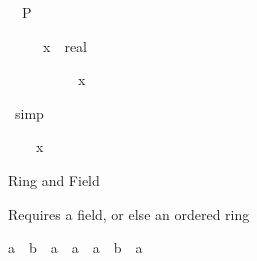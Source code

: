 \begin{isabellebody}
\begin{isamarkuptxt}
\begin{isabelle}
\ {}{\isachardot}\ P\ {\isacharparenleft}{}\ {\isacharslash}\ {}{\isacharparenright}%
\end{isabelle}%
\end{isamarkuptxt}%
\isamarkuptrue%
\isamarkupfalse%
%
\endisatagproof
{\isafoldproof}%
%
\isadelimproof
%
\endisadelimproof
\isanewline
\isanewline
{}\isamarkupfalse%
\ {\isachardoublequoteopen}{\isacharparenleft}{}{\isacharslash}{}{\isacharparenright}\ {\isacharasterisk}\ {\isacharparenleft}{}{\isacharslash}{}{}{\isacharparenright}\ {\isacharless}\ {\isacharparenleft}x\ {\isacharcolon}{\isacharcolon}\ real{\isacharparenright}{\isachardoublequoteclose}%
\isadelimproof
%
\endisadelimproof
%
\isatagproof
%
\begin{isamarkuptxt}%
\begin{isabelle}%
\ {}{\isachardot}\ {}\ {\isacharslash}\ {}\ {\isacharasterisk}\ {\isacharparenleft}{}\ {\isacharslash}\ {}{}{\isacharparenright}\ {\isacharless}\ x%
\end{isabelle}%
\end{isamarkuptxt}%
\isamarkuptrue%
\isamarkupfalse%
\ simp%
\begin{isamarkuptxt}%
\begin{isabelle}%
\ {}{\isachardot}\ {}\ {\isacharless}\ x\ {\isacharasterisk}\ {}%
\end{isabelle}%
\end{isamarkuptxt}%
\isamarkuptrue%
\isamarkupfalse%
%
\endisatagproof
{\isafoldproof}%
%
\isadelimproof
%
\endisadelimproof
%
\begin{isamarkuptext}%
Ring and Field

Requires a field, or else an ordered ring

\begin{isabelle}%
{\isacharparenleft}a\ {\isacharasterisk}\ b\ {\isacharequal}\ {\isacharparenleft}{}{\isasymColon}{\isacharprime}a{\isacharparenright}{\isacharparenright}\ {\isacharequal}\ {\isacharparenleft}a\ {\isacharequal}\ {\isacharparenleft}{}{\isasymColon}{\isacharprime}a{\isacharparenright}\ {\isasymor}\ b\ {\isacharequal}\ {\isacharparenleft}{}{\isasymColon}{\isacharprime}a{\isacharparenright}{\isacharparenright}%
\end{isabelle}


\end{isamarkuptext}
\end{isabellebody}
